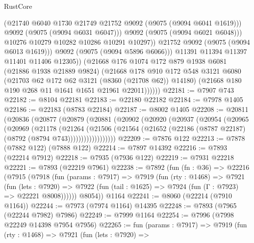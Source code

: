 \begin{lexlean}{RustCore}
\begin{coremodule}
                          (@21740 @6040 @1730 @21749 @21752 @9092 (@9075 (@9094 @6041 @1619)))
                          @9092
                          (@9075 (@9094 @6031 @6047)))
                        @9092
                        (@9075 (@9094 @6021 @6048)))
                      @10276
                      @10279
                      @10282
                      @10286
                      @10291
                      @10297))
                  @21752
                  @9092
                  (@9075 (@9094 @6013 @1619)))
                @9092
                (@9075 (@9094 @5896 @6066)))
              @11391
              @11394
              @11397
              @11401
              @11406
              @12305))
          (@21668
            @176
            @1074
            @172
            @879
            @1938
            @6081
            (@21886 @1938 @21889 @9824)
            (@21668
              @178
              @910
              @172
              @548
              @3121
              @6080
              (@21703 @62 @172 @62 @3121 (@8360 (@21708 @62)) @14180)
              (@21668 @180 @190 @268 @11 @1641 @1651 @21961 @22011))))))
@22181 := @7907 @743
@22182 := @8104 @22181
@22183 := @22180 @22182
@22184 := @7978 @1405
@22186 := @22183 (@8783 @22184)
@22187 := @8002 @1405
@22208 := @20811
    (@20836
      (@20877
        (@20879
          (@20881
            (@20902
              (@20920
                (@20937
                  (@20954
                    (@20965
                      (@20969
                        (@21178
                          (@21264
                            (@21506
                              (@21564
                                (@21652 (@22186 (@8787 @22187) (@8792 (@8794 @743))))))))))))))))))
@22209 := @7876 @122
@22213 := @7878 (@7882 @122) (@7888 @122)
@22214 := @7897 @14392
@22216 := @7893 (@22214 @7912)
@22218 := @7935 (@7936 @122)
@22219 := @7931 @22218
@22221 := @7893 (@22219 @7961)
@22238 := @7892
    (fun (fn : @36) =>
    @22216
      (@7915
        (@7918
          (fun (params : @7917) =>
          @7919
            (fun (rty : @1468) =>
            @7921
              (fun (lets : @7920) =>
              @7922 (fun (tail : @1625) => @7924 (fun (Γ : @7923) => @22221 @8008))))))
        @8054))
    @1164
@22241 := @8060 (@22214 (@7910 @1164))
@22244 := @7973 (@7974 @1164) @14395
@22248 := @7893 (@7965 (@22244 @7982) @7986)
@22249 := @7999 @1164
@22254 := @7996 (@7998 @22249 @14398 @7954 @7956)
@22265 := fun (params : @7917) =>
  @7919
    (fun (rty : @1468) =>
    @7921
      (fun (lets : @7920) =>

\end{coremodule}
\end{lexlean}
